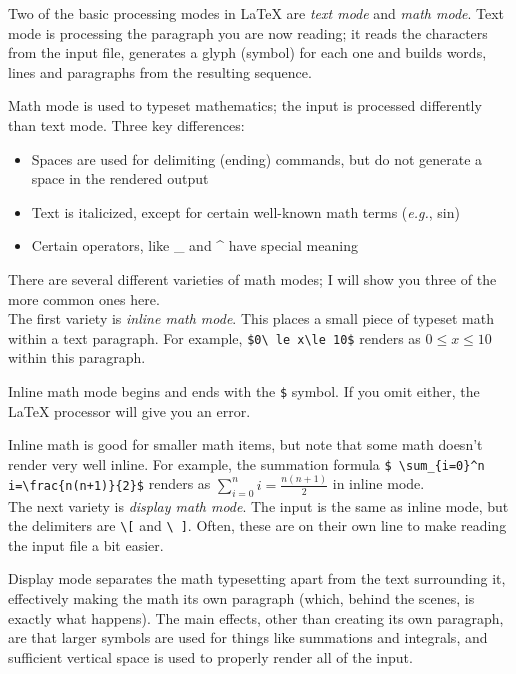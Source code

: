 \documentclass{article}
\begin{document}
  Two of the basic processing modes in \LaTeX{} are \emph{text mode} and
  \emph{math mode}. Text mode is processing the paragraph you are now reading;
  it reads the characters from the input file, generates a glyph (symbol) for
  each one and builds words, lines and paragraphs from the resulting sequence.

  Math mode is used to typeset mathematics; the input is processed differently
  than text mode. Three key differences:
  \begin{itemize}
    \item Spaces are used for delimiting (ending) commands, but do not generate
    a space in the rendered output
    \item Text is italicized, except for certain well-known math terms
    (\emph{e.g.}, sin)
    \item Certain operators, like \_ and \^{} have special meaning
  \end{itemize}
  \vskip6pt

  There are several different varieties of math modes; I will show you three of
  the more common ones here.\\

  The first variety is \emph{inline math mode}. This places a small piece of
  typeset math within a text paragraph. For example, {\tt \$0\textbackslash
  le x\textbackslash le 10\$} renders as $0\le x\le 10$ within this paragraph.

  Inline math mode begins and ends with the {\tt \$} symbol. If you omit either,
  the \LaTeX{} processor will give you an error.

  Inline math is good for smaller math items, but note that some math doesn't
  render very well inline. For example, the summation formula {\tt \$%
  \textbackslash sum\_\{i=0\}\^{}n i=\textbackslash frac\{n(n+1)\}\{2\}\$}
  renders as $\sum_{i=0}^n i=\frac{n(n+1)}{2}$ in inline mode.\\

  The next variety is \emph{display math mode}. The input is the same as inline
  mode, but the delimiters are {\tt \textbackslash [} and {\tt \textbackslash
  ]}. Often, these are on their own line to make reading the input file a bit
  easier.

  Display mode separates the math typesetting apart from the text surrounding
  it, effectively making the math its own paragraph (which, behind the scenes,
  is exactly what happens). The main effects, other than creating its own
  paragraph, are that larger symbols are used for things like summations and
  integrals, and sufficient vertical space is used to properly render all of the
  input.\\
\end{document}
